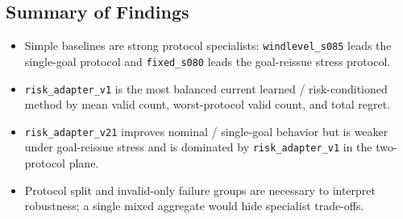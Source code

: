 \subsection{Summary of Findings}

\begin{itemize}
  \item Simple baselines are strong protocol specialists:
  \texttt{windlevel\_s085} leads the single-goal protocol and
  \texttt{fixed\_s080} leads the goal-reissue stress protocol.
  \item \texttt{risk\_adapter\_v1} is the most balanced current learned /
  risk-conditioned method by mean valid count, worst-protocol valid count, and
  total regret.
  \item \texttt{risk\_adapter\_v21} improves nominal / single-goal behavior but
  is weaker under goal-reissue stress and is dominated by
  \texttt{risk\_adapter\_v1} in the two-protocol plane.
  \item Protocol split and invalid-only failure groups are necessary to
  interpret robustness; a single mixed aggregate would hide specialist
  trade-offs.
\end{itemize}

